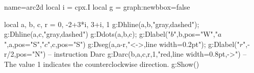 \documentclass[border=5pt]{standalone}
\begin{document}
\begin{luadraw}{name=arc2d}
local i = cpx.I
local g = graph:new{bbox=false}

local a, b, c, r = 0, -2+3*i, 3+i, 1
g:Dhline({a,b},"gray,dashed"); g:Dhline({a,c},"gray,dashed")
g:Ddots({a,b,c}); g:Dlabel("$b$",b,{pos="W"},"$a$",a,{pos="S"},"$c$",c,{pos="S"})
g:Dseg({a,a-r},"<->,line width=0.2pt"); g:Dlabel("$r$",-r/2,{pos="N"})
-- instruction Darc
g:Darc(b,a,c,r,1,"red,line width=0.8pt,->")  -- The value 1 indicates the counterclockwise direction.
g:Show()
\end{luadraw}
\end{document}
